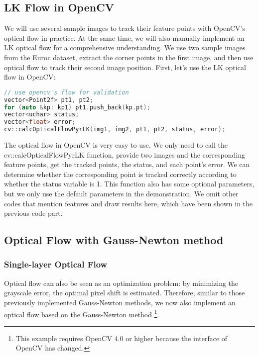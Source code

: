 %
\subsection{LK Flow in OpenCV}
We will use several sample images to track their feature points with OpenCV's optical flow in practice. At the same time, we will also manually implement an LK optical flow for a comprehensive understanding. We use two sample images from the Euroc dataset, extract the corner points in the first image, and then use optical flow to track their second image position. First, let's use the LK optical flow in OpenCV:

\begin{lstlisting}[language=c++,caption=slambook2/ch8/optical_flow.cpp (part)]
// use opencv's flow for validation
vector<Point2f> pt1, pt2;
for (auto &kp: kp1) pt1.push_back(kp.pt);
vector<uchar> status;
vector<float> error;
cv::calcOpticalFlowPyrLK(img1, img2, pt1, pt2, status, error);
\end{lstlisting}

The optical flow in OpenCV is very easy to use. We only need to call the cv::calcOpticalFlowPyrLK function, provide two images and the corresponding feature points, get the tracked points, the status, and each point's error. We can determine whether the corresponding point is tracked correctly according to whether the status variable is 1. This function also has some optional parameters, but we only use the default parameters in the demonstration. We omit other codes that mention features and draw results here, which have been shown in the previous code part.

\subsection{Optical Flow with Gauss-Newton method}
\subsubsection{Single-layer Optical Flow}
Optical flow can also be seen as an optimization problem: by minimizing the grayscale error, the optimal pixel shift is estimated. Therefore, similar to those previously implemented Gauss-Newton methods, we now also implement an optical flow based on the Gauss-Newton method \footnote{This example requires OpenCV 4.0 or higher because the interface of OpenCV has changed.}.

